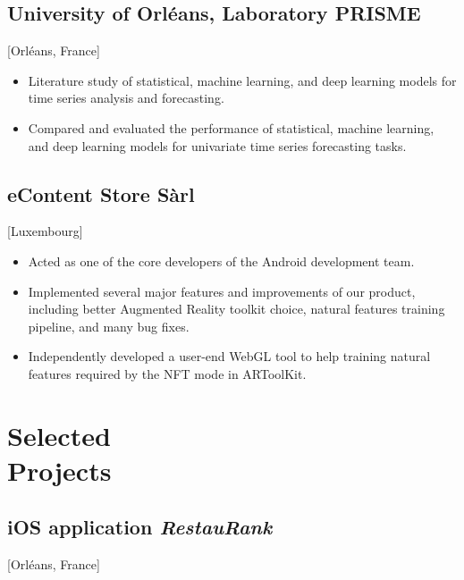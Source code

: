 \documentclass{mycv}
\begin{document}
\subsection{University of Orl\'eans, Laboratory PRISME}[Orl\'eans, France]
\begin{positions}
\end{positions}

\begin{itemize}
    \item Literature study of statistical, machine learning, and deep learning models for time series analysis and forecasting.
    \item Compared and evaluated the performance of statistical, machine learning, and deep learning models for univariate time series forecasting tasks.
\end{itemize}

\subsection{eContent Store S\`arl}[Luxembourg]
\begin{positions}
\end{positions}

\begin{itemize}
  \item Acted as one of the core developers of the Android development team.
  \item Implemented several major features and improvements of our product, including better Augmented Reality toolkit choice, natural features training pipeline, and many bug fixes.
  \item Independently developed a user-end WebGL tool to help training natural features required by the NFT mode in ARToolKit.
\end{itemize}

\section{Selected \\ Projects}

\subsection{iOS application \textit{RestauRank}}[Orl\'eans, France]
\begin{positions}
\end{positions}
\end{document}
